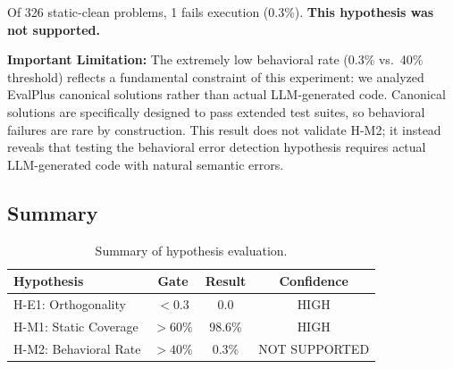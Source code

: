 Of 326 static-clean problems, 1 fails execution (0.3\%). \textbf{This hypothesis was not supported.}

\textbf{Important Limitation:} The extremely low behavioral rate (0.3\% vs.\ 40\% threshold) reflects a fundamental constraint of this experiment: we analyzed EvalPlus canonical solutions rather than actual LLM-generated code. Canonical solutions are specifically designed to pass extended test suites, so behavioral failures are rare by construction. This result does not validate H-M2; it instead reveals that testing the behavioral error detection hypothesis requires actual LLM-generated code with natural semantic errors.

\subsection{Summary}

\begin{table}[h]
\centering
\begin{tabular}{lccc}
\toprule
\textbf{Hypothesis} & \textbf{Gate} & \textbf{Result} & \textbf{Confidence} \\
\midrule
H-E1: Orthogonality & $< 0.3$ & 0.0 & HIGH \\
H-M1: Static Coverage & $> 60\%$ & 98.6\% & HIGH \\
H-M2: Behavioral Rate & $> 40\%$ & 0.3\% & NOT SUPPORTED \\
\bottomrule
\end{tabular}
\caption{Summary of hypothesis evaluation.}
\label{tab:summary}
\end{table}
